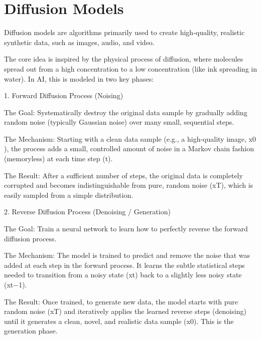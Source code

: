 \chapter{Diffusion Models}

Diffusion models are algorithms primarily used to create high-quality,
realistic synthetic data, such as images, audio, and video.


The core idea is inspired by the physical process of diffusion, where molecules spread out from a high concentration to a low concentration (like ink spreading in water). In AI, this is modeled in two key phases:

1. Forward Diffusion Process (Noising)

The Goal: Systematically destroy the original data sample by gradually adding random noise (typically Gaussian noise) over many small, sequential steps.

The Mechanism: Starting with a clean data sample (e.g., a high-quality image, x0​), the process adds a small, controlled amount of noise in a Markov chain fashion (memoryless) at each time step (t).

The Result: After a sufficient number of steps, the original data is completely corrupted and becomes indistinguishable from pure, random noise (xT​), which is easily sampled from a simple distribution.

2. Reverse Diffusion Process (Denoising / Generation)

    The Goal: Train a neural network to learn how to perfectly reverse the forward diffusion process.

The Mechanism: The model is trained to predict and remove the noise that was added at each step in the forward process. It learns the subtle statistical steps needed to transition from a noisy state (xt​) back to a slightly less noisy state (xt−1​).

The Result: Once trained, to generate new data, the model starts with pure random noise (xT​) and iteratively applies the learned reverse steps (denoising) until it generates a clean, novel, and realistic data sample (x0​). This is the generation phase.

